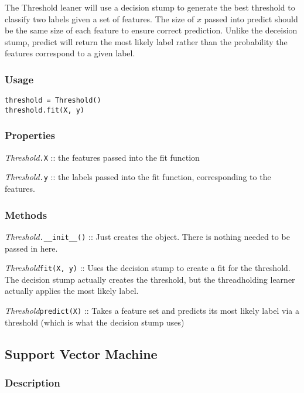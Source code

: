 \documentclass{article}
\begin{document}
The Threshold leaner will use a decision stump to generate the best threshold to
classify two labels given a set of features. The size of $x$ passed into predict
should be the same size of each feature to ensure correct prediction. Unlike the
deceision stump, predict will return the most likely label rather than the
probability the features correspond to a given label.

\subsubsection{Usage}

\begin{verbatim}
threshold = Threshold()
threshold.fit(X, y)
\end{verbatim}

\subsubsection{Properties}

\textit{Threshold}\texttt{.X} :: the features passed into the fit function

\textit{Threshold}\texttt{.y} :: the labels passed into the fit function,
corresponding to the features.

\subsubsection{Methods}

\textit{Threshold}\texttt{.\_\_init\_\_()} :: Just creates the object. There
is nothing needed to be passed in here.

\textit{Threshold}\texttt{fit(X, y)} :: Uses the decision stump to create a fit
for the threshold. The decision stump actually creates the threshold, but the
threadholding learner actually applies the most likely label.

\textit{Threshold}\texttt{predict(X)} :: Takes a feature set and predicts its
most likely label via a threshold (which is what the decision stump uses)

\subsection{Support Vector Machine}

\subsubsection{Description}
\end{document}
